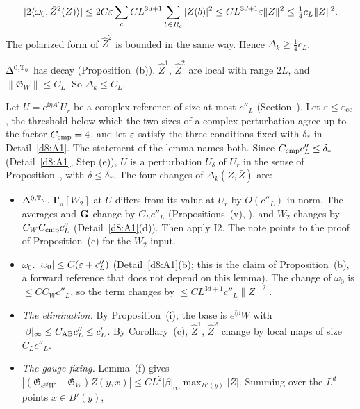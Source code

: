 \begin{detail}
\begin{step}
\[
|2\langle \omega_0,\hat Z^2(Z)\rangle|\le2C\varepsilon\sum_cCL^{3d+1}\sum_{b\in R_c}|Z(b)|^2\le CL^{3d+1}\varepsilon\|Z\|^2\le\tfrac14c_L\|Z\|^2 .
\]
The polarized form of $\hat Z^2$ is bounded in the same way. Hence $\Delta_k\ge\frac14c_L$.
\end{step}
\begin{step}
$\Delta^{0,\mathbb T_\eta}$ has decay (Proposition~(b)). $\hat Z^1$, $\hat Z^2$ are local with range $2L$, and $\|\mathfrak G_W\|\le C_L$. So $\Delta_k\le C_L$.
\end{step}
\end{detail}

\begin{detail}\label{d8:cg-complex}
Let $U=e^{\ii\eta A'}U_r$ be a complex reference of size at most $c''_L$ (Section~). Let $\varepsilon\le\varepsilon_{\rm cc}$, the threshold below which the two sizes of a complex perturbation agree up to the factor $C_{\rm cmp}=4$, and let $\varepsilon$ satisfy the three conditions fixed with $\delta_*$ in Detail~\ref{d8:A1}. The statement of the lemma names both. Since $C_{\rm cmp}c''_L\le\delta_*$ (Detail~\ref{d8:A1}, Step (e)), $U$ is a perturbation $U_\delta$ of $U_r$ in the sense of Proposition~, with $\delta\le\delta_*$. The four changes of $\Delta_k(Z,\bar Z)$ are:
\begin{itemize}
\item \emph{$\Delta^{0,\mathbb T_\eta}$.} $\boldsymbol\Gamma_\pi[W_2]$ at $U$ differs from its value at $U_r$ by $O(c''_L)$ in norm. The averages and $\mathbf G$ change by $C_Lc''_L$ (Propositions~(v), ), and $W_2$ changes by $C_WC_{\rm cmp}c''_L$ (Detail~\ref{d8:A1}(d)). Then apply I2. The note points to the proof of Proposition~(c) for the $W_2$ input.
\item \emph{$\omega_0$.} $|\omega_0|\le C(\varepsilon+c''_L)$ (Detail~\ref{d8:A1}(b); this is the claim of Proposition~(b), a forward reference that does not depend on this lemma). The change of $\omega_0$ is $\le CC_Wc''_L$, so the term changes by $\le CL^{3d+1}c''_L\|Z\|^2$.
\item \emph{The elimination.} By Proposition~(i), the base is $e^{\ii\beta}W$ with $|\beta|_\infty\le C_{\rm AB}c''_L\le c'_L$. By Corollary~(c), $\hat Z^1$, $\hat Z^2$ change by local maps of size $C_Lc''_L$.
\item \emph{The gauge fixing.} Lemma~(f) gives $|(\mathfrak G_{e^{\ii\beta}W}-\mathfrak G_W)Z(y,x)|\le CL^2|\beta|_\infty\max_{B'(y)}|Z|$. Summing over the $L^d$ points $x\in B'(y)$,

\end{itemize}
\end{detail}
